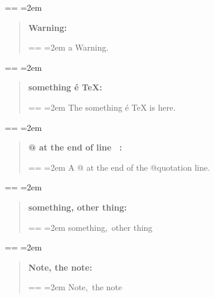 \documentclass{book}
\makeatletter
\newenvironment{GNUTexinfopreformatted}{%
  \par\obeylines\obeyspaces\frenchspacing
  \parskip=\z@\parindent=\z@}{}
\makeatother
\begin{document}
\begin{GNUTexinfopreformatted}
\leftskip=2em\relax\ttfamily%

\end{GNUTexinfopreformatted}
\begin{quote}
\textbf{Warning:} \begin{GNUTexinfopreformatted}
\leftskip=2em\relax\ttfamily%
a Warning.
\end{GNUTexinfopreformatted}
\end{quote}
\begin{GNUTexinfopreformatted}
\leftskip=2em\relax\ttfamily%

\end{GNUTexinfopreformatted}
\begin{quote}
\textbf{something \'{e} \TeX{}:} \begin{GNUTexinfopreformatted}
\leftskip=2em\relax\ttfamily%
The something \'{e} \TeX{} is here.
\end{GNUTexinfopreformatted}
\end{quote}
\begin{GNUTexinfopreformatted}
\leftskip=2em\relax\ttfamily%

\end{GNUTexinfopreformatted}
\begin{quote}
\textbf{@ at the end of line \ {}:} \begin{GNUTexinfopreformatted}
\leftskip=2em\relax\ttfamily%
A @ at the end of the @quotation line.
\end{GNUTexinfopreformatted}
\end{quote}
\begin{GNUTexinfopreformatted}
\leftskip=2em\relax\ttfamily%

\end{GNUTexinfopreformatted}
\begin{quote}
\textbf{something, other thing:} \begin{GNUTexinfopreformatted}
\leftskip=2em\relax\ttfamily%
something,\ other thing
\end{GNUTexinfopreformatted}
\end{quote}
\begin{GNUTexinfopreformatted}
\leftskip=2em\relax\ttfamily%

\end{GNUTexinfopreformatted}
\begin{quote}
\textbf{Note, the note:} \begin{GNUTexinfopreformatted}
\leftskip=2em\relax\ttfamily%
Note,\ the note
\end{GNUTexinfopreformatted}
\end{quote}
\end{document}
